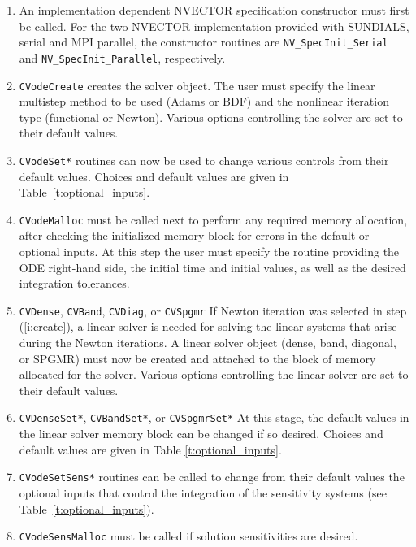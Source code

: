 \begin{enumerate}
\item \label{i:nvspec}
  An implementation dependent NVECTOR specification constructor must first
  be called. For the two NVECTOR implementation provided with SUNDIALS, serial
  and MPI parallel, the constructor routines are {\tt NV\_SpecInit\_Serial}
  and {\tt NV\_SpecInit\_Parallel}, respectively.
\item \label{i:create}
  {\tt CVodeCreate} 
  creates the solver object.
  The user must specify the linear multistep method to be used 
  (Adams or BDF) and the nonlinear iteration type (functional or Newton).
  Various options controlling the solver are set to their default values.
\item \label{i:set}
  {\tt CVodeSet*} 
  routines can now be used to change various controls from their default values.
  Choices and default values are given in Table~\ref{t:optional_inputs}.
\item \label{i:malloc}
  {\tt CVodeMalloc}
  must be called next to perform any required memory allocation, after checking 
  the initialized memory block for errors in the default or optional inputs. 
  At this step the user must specify the routine providing the ODE right-hand 
  side, the initial time and initial values, as well as the desired
  integration tolerances.
\item \label{i:linear}
  {\tt CVDense}, {\tt CVBand}, {\tt CVDiag}, or {\tt CVSpgmr}
  If Newton iteration was selected in step (\ref{i:create}), a linear solver  
  is needed for solving the linear systems that arise during the Newton iterations. 
  A linear solver object (dense, band, diagonal, or SPGMR) must now be created
  and attached to the block of memory allocated for the solver.
  Various options controlling the linear solver are set to their default values.
\item \label{i:ls_set}
  {\tt CVDenseSet*}, {\tt CVBandSet*}, or {\tt CVSpgmrSet*}
  At this stage, the default values in the linear solver memory block can be
  changed if so desired. 
  Choices and default values are given in Table \ref{t:optional_inputs}.
\item \label{i:sensi_set}
  {\tt CVodeSetSens*}
  routines can be called to change from their default values the optional inputs
  that control the integration of the sensitivity systems 
  (see Table~\ref{t:optional_inputs}).
\item \label{i:sensi_malloc} 
  {\tt CVodeSensMalloc}
  must be called if solution sensitivities are desired.

\end{enumerate}
